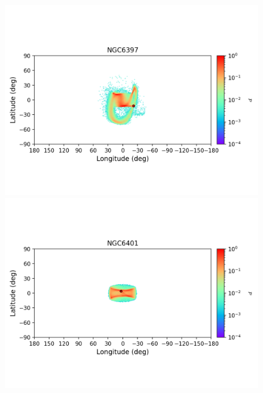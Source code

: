 \begin{figure}
\begin{center}
                \includegraphics[clip=true, trim = 0mm 20mm 0mm 10mm, width=1\columnwidth]{images/error_plots_NGC6397.png}
                \includegraphics[clip=true, trim = 0mm 20mm 0mm 10mm, width=1\columnwidth]{images/error_plots_NGC6401.png}
                

\end{center}
\end{figure}
